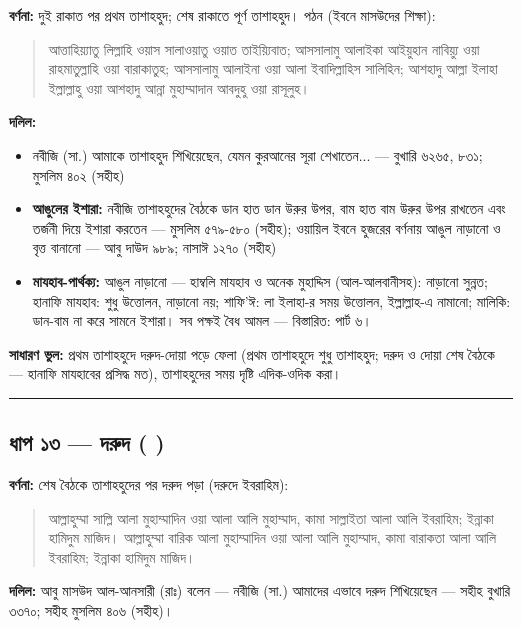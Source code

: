 \textbf{বর্ণনা:} দুই রাকাত পর প্রথম তাশাহহুদ; শেষ রাকাতে পূর্ণ তাশাহহুদ। পঠন (ইবনে মাসউদের শিক্ষা):

\begin{quote}
আত্তাহিয়্যাতু লিল্লাহি ওয়াস সালাওয়াতু ওয়াত তাইয়্যিবাত; আসসালামু আলাইকা আইয়ুহান নাবিয়্যু ওয়া রাহমাতুল্লাহি ওয়া বারাকাতুহ; আসসালামু আলাইনা ওয়া আলা ইবাদিল্লাহিস সালিহিন; আশহাদু আল্লা ইলাহা ইল্লাল্লাহু ওয়া আশহাদু আন্না মুহাম্মাদান আবদুহু ওয়া রাসূলুহ।
\end{quote}

\textbf{দলিল:}
\begin{itemize}
\item {}নবীজি (সা.) আমাকে তাশাহহুদ শিখিয়েছেন, যেমন কুরআনের সূরা শেখাতেন... — বুখারি ৬২৬৫, ৮৩১; মুসলিম ৪০২ (সহীহ)
\item \textbf{আঙুলের ইশারা:} নবীজি তাশাহহুদের বৈঠকে ডান হাত ডান উরুর উপর, বাম হাত বাম উরুর উপর রাখতেন এবং তর্জনী দিয়ে ইশারা করতেন — মুসলিম ৫৭৯-৫৮০ (সহীহ); ওয়ায়িল ইবনে হুজরের বর্ণনায় আঙুল নাড়ানো ও বৃত্ত বানানো — আবু দাউদ ৯৮৯; নাসাঈ ১২৭০ (সহীহ)
\item \textbf{মাযহাব-পার্থক্য:} আঙুল নাড়ানো — হাম্বলি মাযহাব ও অনেক মুহাদ্দিস (আল-আলবানীসহ): নাড়ানো সুন্নত; হানাফি মাযহাব: শুধু উত্তোলন, নাড়ানো নয়; শাফি'ঈ: লা ইলাহা-র সময় উত্তোলন, ইল্লাল্লাহ-এ নামানো; মালিকি: ডান-বাম না করে সামনে ইশারা। সব পক্ষই বৈধ আমল — বিস্তারিত: পার্ট ৬।
\end{itemize}
\textbf{সাধারণ ভুল:} প্রথম তাশাহহুদে দরুদ-দোয়া পড়ে ফেলা (প্রথম তাশাহহুদে শুধু তাশাহহুদ; দরুদ ও দোয়া শেষ বৈঠকে — হানাফি মাযহাবের প্রসিদ্ধ মত), তাশাহহুদের সময় দৃষ্টি এদিক-ওদিক করা।

\medskip\hrule\medskip

\subsection*{ধাপ ১৩ — দরুদ (    )}

\textbf{বর্ণনা:} শেষ বৈঠকে তাশাহহুদের পর দরুদ পড়া (দরুদে ইবরাহিম):

\begin{quote}
আল্লাহুম্মা সাল্লি আলা মুহাম্মাদিন ওয়া আলা আলি মুহাম্মাদ, কামা সাল্লাইতা আলা আলি ইবরাহিম; ইন্নাকা হামিদুম মাজিদ। আল্লাহুম্মা বারিক আলা মুহাম্মাদিন ওয়া আলা আলি মুহাম্মাদ, কামা বারাকতা আলা আলি ইবরাহিম; ইন্নাকা হামিদুম মাজিদ।
\end{quote}

\textbf{দলিল:} আবু মাসউদ আল-আনসারী (রাঃ) বলেন — নবীজি (সা.) আমাদের এভাবে দরুদ শিখিয়েছেন — সহীহ বুখারি ৩৩৭০; সহীহ মুসলিম ৪০৬ (সহীহ)।

